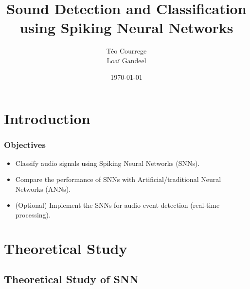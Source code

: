 \documentclass[aspectratio=169, 11pt]{beamer}
\title[Sound Detection and Classification]{\textbf{Sound Detection and Classification}\\ using Spiking Neural Networks}
\author[T. Courrege, L. Gandeel]{Téo Courrege\\Loaï Gandeel}
\date{\today}
\begin{document}
\begin{frame}[plain]
  \titlepage
\end{frame}

\section{Introduction}

\begin{frame}
  \frametitle{Objectives}
  \begin{itemize}
    \item Classify audio signals using Spiking Neural Networks (SNNs).
    \item Compare the performance of SNNs with Artificial/traditional Neural Networks (ANNs).
    \item (Optional) Implement the SNNs for audio event detection (real-time processing).
  \end{itemize}
\end{frame}

\section{Theoretical Study}

\subsection{Theoretical Study of SNN}
\end{document}
